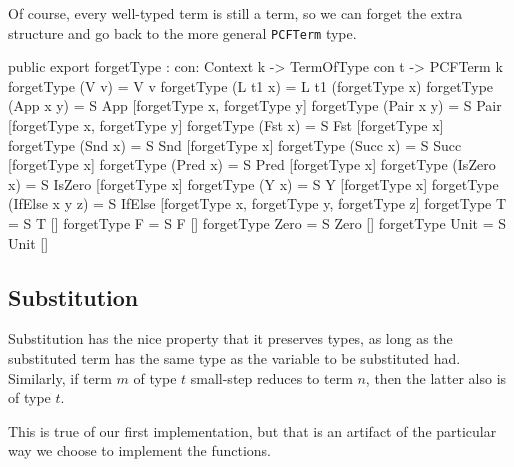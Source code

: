 Of course, every well-typed term is still a term, so we can forget the extra structure and go back
to the more general \texttt{PCFTerm} type.
\begin{code}
public export
forgetType : {con: Context k} -> TermOfType con t -> PCFTerm k
forgetType (V v)      = V v
forgetType (L t1 x)   = L t1 (forgetType x)
forgetType (App x y)  = S App   [forgetType x, forgetType y]
forgetType (Pair x y) = S Pair  [forgetType x, forgetType y]
forgetType (Fst x)    = S Fst   [forgetType x]
forgetType (Snd x)    = S Snd   [forgetType x]
forgetType (Succ x)   = S Succ  [forgetType x]
forgetType (Pred x)   = S Pred  [forgetType x]
forgetType (IsZero x) = S IsZero [forgetType x]
forgetType (Y x)      = S Y     [forgetType x]
forgetType (IfElse x y z) = S IfElse [forgetType x, forgetType y, forgetType z]
forgetType T          = S T []
forgetType F          = S F []
forgetType Zero       = S Zero []
forgetType Unit       = S Unit []
\end{code}

\subsection{Substitution}
Substitution has the nice property that it preserves types, as long as the substituted term has 
the same type as the variable to be substituted had. Similarly, if term $m$ of type $t$
small-step reduces to term $n$, then the latter also is of type $t$.

This is true of our first implementation, but that is an artifact of the particular way we choose to implement the functions. 